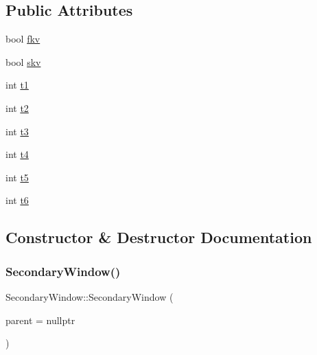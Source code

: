 \subsection*{Public Attributes}
\begin{DoxyCompactItemize}
\item 
bool \mbox{\hyperlink{class_secondary_window_a31e12878c163cb0c0286c4fc0cc2cea4}{fkv}}
\item 
bool \mbox{\hyperlink{class_secondary_window_a30473d634963bdef52d8e46d6015d242}{skv}}
\item 
int \mbox{\hyperlink{class_secondary_window_a058000e4081c2a070db3b3e37697a22a}{t1}}
\item 
int \mbox{\hyperlink{class_secondary_window_ac924327f4a2a2c9c61a230f84f46f10d}{t2}}
\item 
int \mbox{\hyperlink{class_secondary_window_a83867d3fe2d9fa0e0ed96eaf52696988}{t3}}
\item 
int \mbox{\hyperlink{class_secondary_window_a8588d827c5ae4c745e1555e386621c7c}{t4}}
\item 
int \mbox{\hyperlink{class_secondary_window_add1e599530a5b8502fb502f090e67d3f}{t5}}
\item 
int \mbox{\hyperlink{class_secondary_window_a35d7a84fec48761c11414615c27b20ba}{t6}}
\end{DoxyCompactItemize}


\subsection{Constructor \& Destructor Documentation}
\mbox{\label{class_secondary_window_ada7e8bd04f97a10187d96c0f7954d19c}} 
\subsubsection{\texorpdfstring{Secondary\+Window()}{SecondaryWindow()}}
{\footnotesize\ttfamily Secondary\+Window\+::\+Secondary\+Window (\begin{DoxyParamCaption}\item[{Q\+Widget $\ast$}]{parent = {\ttfamily nullptr} }\end{DoxyParamCaption})\hspace{0.3cm}{\ttfamily [explicit]}}

\mbox{\label{class_secondary_window_a631a54788ff219afd9be3c6378113277}} 
